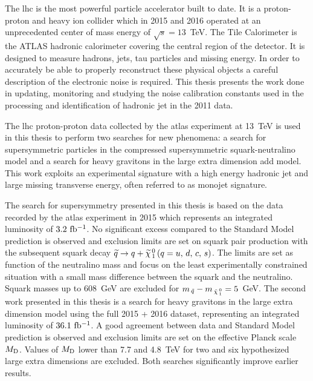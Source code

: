 The \gls{lhc} is the most powerful particle accelerator built to date. It is a
proton-proton and heavy ion collider which in 2015 and 2016 operated at an
unprecedented center of mass energy of $\sqrt{s} = 13$~TeV. The Tile Calorimeter
is the ATLAS hadronic calorimeter covering the central region of the
detector. It is designed to measure hadrons, jets, tau particles and missing
energy. In order to accurately be able to properly reconstruct these physical
objects a careful description of the electronic noise is required. This thesis
presents the work done in updating, monitoring and studying the noise
calibration constants used in the processing and identification of hadronic jet
in the 2011 data.

The \gls{lhc} proton-proton data collected by the \gls{atlas} experiment at
13~TeV is used in this thesis to perform two searches for new phenomena: a
search for supersymmetric particles in the compressed supersymmetric
squark-neutralino model and a search for heavy gravitons in the large extra
dimension \gls{add} model. This work exploits an experimental signature with a
high energy hadronic jet and large missing transverse energy, often referred to
as monojet signature.

The search for supersymmetry presented in this thesis is based on the data
recorded by the \gls{atlas} experiment in 2015 which represents an integrated
luminosity of $3.2~\mbox{fb$^{-1}$}$. No significant excess compared to the Standard Model
prediction is observed and exclusion limits are set on squark pair production
with the subsequent squark decay $\widetilde{q} \rightarrow q + \widetilde{\chi}_{\, 1}^{\, 0}\, (q = u,\, d,\, c,\, s)$. The limits are set as function
of the neutralino mass and focus on the least experimentally constrained
situation with a small mass difference between the squark and the
neutralino. Squark masses up to 608~GeV are excluded for
$m_{\, \tilde{q}} - m_{\, \tilde{\chi}_{\, 1}^{\, 0}} = 5$~GeV. The second work presented in this thesis is a
search for heavy gravitons in the large extra dimension model using the full
2015 + 2016 dataset, representing an integrated luminosity of $36.1~\mbox{fb$^{-1}$}$. A
good agreement between data and Standard Model prediction is observed and
exclusion limits are set on the effective Planck scale $M_\mathrm{D}$. Values of $M_\mathrm{D}$
lower than 7.7 and 4.8~TeV for two and six hypothesized large extra dimensions
are excluded. Both searches significantly improve earlier results.
